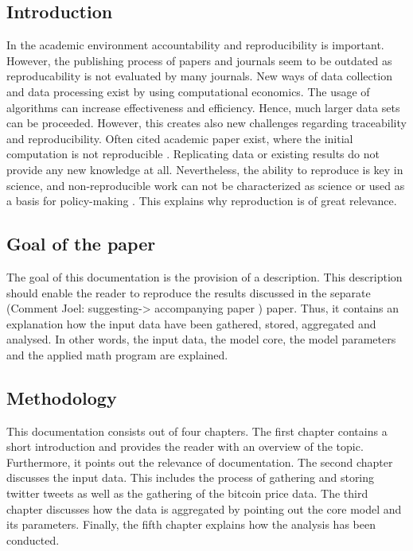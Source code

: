\documentclass[a4paper,12pt]{article}
\begin{document}
\clearpage

\begin{spacing}{1.2}
\cleardoublepage{}

\section{Introduction}
In the academic environment accountability and reproducibility is important. However, the publishing process of papers and journals seem to be outdated as reproducability is not evaluated by many journals. \parencite[p.~888]{mccullough2003} New ways of data collection and data processing exist by using computational economics. The usage of algorithms can increase effectiveness and efficiency. Hence, much larger data sets can be proceeded. However, this creates also new challenges regarding traceability and reproducibility. Often cited academic paper exist, where the initial computation is not reproducible \parencite[pp.~874--887]{mccullough2003}. Replicating data or existing results do not provide any new knowledge at all. Nevertheless, the ability to reproduce is key in science, and non-reproducible work can not be characterized as science or used as a basis for policy-making \parencite[p.~888]{mccullough2003}. This explains why reproduction is of great relevance.

\subsection{Goal of the paper}
The goal of this documentation is the provision of a description. This description should enable the reader to reproduce the results discussed in the separate (Comment Joel: suggesting-> accompanying paper ) paper. Thus, it contains an explanation how the input data have been gathered, stored, aggregated and analysed. In other words, the input data, the model core, the model parameters and the applied math program are explained.

\subsection{Methodology}
This documentation consists out of four chapters. The first chapter contains a short introduction and provides the reader with an overview of the topic. Furthermore, it points out the relevance of documentation. The second chapter discusses the input data. This includes the process of gathering and storing twitter tweets as well as the gathering of the bitcoin price data. The third chapter discusses how the data is aggregated by pointing out the core model and its parameters. Finally, the fifth chapter explains how the analysis has been conducted.


\end{spacing}
\end{document}
